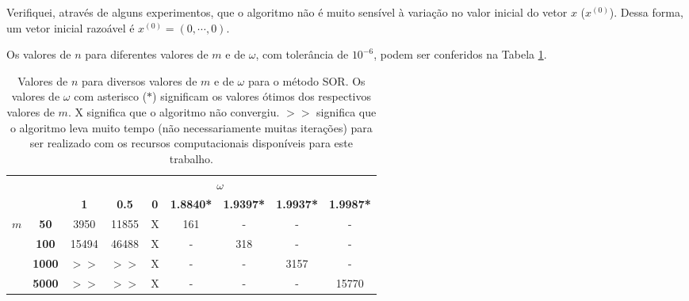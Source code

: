 \documentclass{article}
\begin{document}
\begin{enumerate}
\begin{enumerate}
                    Verifiquei, através de alguns experimentos, que o algoritmo não é muito sensível à variação no valor inicial do vetor $x$ ($x^{(0)}$).
                    Dessa forma, um vetor inicial razoável é $x^{(0)}=(0, \cdots, 0)$.

                    Os valores de $n$ para diferentes valores de $m$ e de $\omega$, com tolerância de 
                    $10^{-6}$, podem ser conferidos na Tabela \ref{tab:omega_m}.

                    \begin{table}[!h]
                        \centering
                        \begin{tabular}{cc|c|c|c|c|c|c|c|}
                            \cline{3-9}
                                                &               & \multicolumn{7}{c|}{\textbf{$\omega$}}      \\ \cline{3-9} 
                            &
                            &
                            \textbf{1} &
                            \textbf{0.5} &
                            \textbf{0} &
                            \textbf{1.8840*} &
                            \textbf{1.9397*} &
                            \textbf{1.9937*} &
                            \textbf{1.9987*} \\ \hline
                            \multicolumn{1}{|c|}{\multirow{4}{*}{\textbf{$m$}}} &
                            \textbf{50} &
                            3950 &
                            11855 &
                            X &
                            161 &
                            - &
                            - &
                            - \\ \cline{2-9} 
                            \multicolumn{1}{|c|}{} & \textbf{100}  & 15494 & 46488 & X & - & 318 & -    & -     \\ \cline{2-9} 
                            \multicolumn{1}{|c|}{} & \textbf{1000} & $>>$ & $>>$ & X & - & -   & 3157 & -     \\ \cline{2-9} 
                            \multicolumn{1}{|c|}{} & \textbf{5000} & $>>$ & $>>$ & X & - & -   & -    & 15770 \\ \hline
                        \end{tabular}
                        \caption{Valores de $n$ para diversos valores de $m$ e de $\omega$ para o método SOR. Os valores de $\omega$ com asterisco ($*$)
                        significam os valores ótimos dos respectivos valores de $m$. X significa que o algoritmo não convergiu. $>>$ significa que o algoritmo
                        leva muito tempo (não necessariamente muitas iterações) para ser realizado com os recursos computacionais disponíveis para este trabalho.}
                        \label{tab:omega_m}
                    \end{table}


\end{enumerate}
\end{enumerate}
\end{document}
